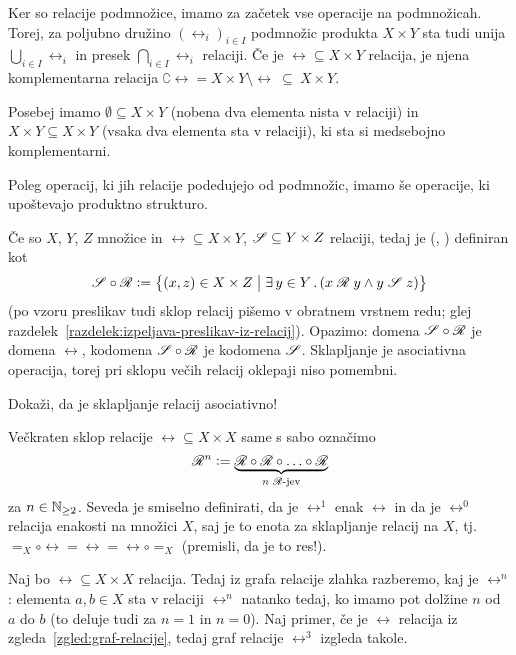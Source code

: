                 Ker so relacije podmnožice, imamo za začetek vse operacije na podmnožicah. Torej, za poljubno družino $(\rel_i)_{i \in I}$ podmnožic produkta $X \times Y$ sta tudi unija $\bigcup_{i \in I} \rel_i$ in presek $\bigcap_{i \in I} \rel_i$ relaciji. Če je $\rel \subseteq X \times Y$ relacija, je njena komplementarna relacija $\complement{\rel} = X \times Y \setminus \rel \ \subseteq \ X \times Y$.

                Posebej imamo  $\emptyset \subseteq X \times Y$ (nobena dva elementa nista v relaciji) in  $X \times Y \subseteq X \times Y$ (vsaka dva elementa sta v relaciji), ki sta si medsebojno komplementarni.

                Poleg operacij, ki jih relacije podedujejo od podmnožic, imamo še operacije, ki upoštevajo produktno strukturo.

                Če so $X$, $Y$, $Z$ množice in $\rel \subseteq X \times Y$, $\srel \subseteq Y \times Z$ relaciji, tedaj je  (, )  definiran kot
                \[\srel \circ \rel \dfeq \set[1]{(x, z) \in X \times Z}{\some{y}[Y]{\rel[x][y] \land \srel[y][z]}}\]
                (po vzoru preslikav tudi sklop relacij pišemo v obratnem vrstnem redu; glej razdelek~\ref{razdelek:izpeljava-preslikav-iz-relacij}). Opazimo: domena $\srel \circ \rel$ je domena $\rel$, kodomena $\srel \circ \rel$ je kodomena $\srel$. Sklapljanje je asociativna operacija, torej pri sklopu večih relacij oklepaji niso pomembni.

                \begin{vaja}
                        Dokaži, da je sklapljanje relacij asociativno!
                \end{vaja}

                Večkraten sklop relacije $\rel \subseteq X \times X$ same s sabo označimo
                \[\rel^n \dfeq \underbrace{\rel \circ \rel \circ \ldots \circ \rel}_{\text{$n$ $\rel$-jev}}\]
                za $n \in \mathbb{N}_{\geq 2}$. Seveda je smiselno definirati, da je $\rel^1$ enak $\rel$ in da je $\rel^0$ relacija enakosti na množici $X$, saj je to enota za sklapljanje relacij na $X$, tj.~$=_X \circ \rel = \rel = \rel \circ =_X$ (premisli, da je to res!).

                \begin{zgled}
                        Naj bo $\rel \subseteq X \times X$ relacija. Tedaj iz grafa relacije zlahka razberemo, kaj je $\rel^n$: elementa $a, b \in X$ sta v relaciji $\rel^n$ natanko tedaj, ko imamo pot dolžine $n$ od $a$ do $b$ (to deluje tudi za $n = 1$ in $n = 0$). Naj primer, če je $\rel$ relacija iz zgleda~\ref{zgled:graf-relacije}, tedaj graf relacije $\rel^3$ izgleda takole.

                \end{zgled}

